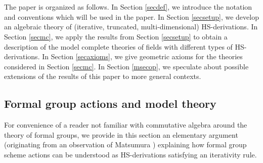 \documentclass[10pt]{amsart}
\theoremstyle{definition}
\begin{document}
\\
\\
The paper is organized as follows. In Section \ref{secdef}, we introduce the notation and conventions which will be used in the paper. In Section \ref{secsetup}, we develop an algebraic theory of (iterative, truncated, multi-dimensional) HS-derivations. In Section \ref{secmc}, we apply the results from Section \ref{secsetup} to obtain a description of the model complete theories of fields with different types of HS-derivations. In Section \ref{secaxioms}, we give geometric axioms for the theories considered in Section \ref{secmc}. In Section \ref{msecop}, we speculate about possible extensions of the results of this paper to more general contexts.


\subsection{Formal group actions and model theory}
For convenience of a reader not familiar with commutative algebra around the theory of formal groups, we provide in this section an elementary argument (originating from an observation of Matsumura \cite[Section 27]{mat}) explaining how formal group scheme actions can be understood as HS-derivations satisfying an iterativity rule.
\end{document}
